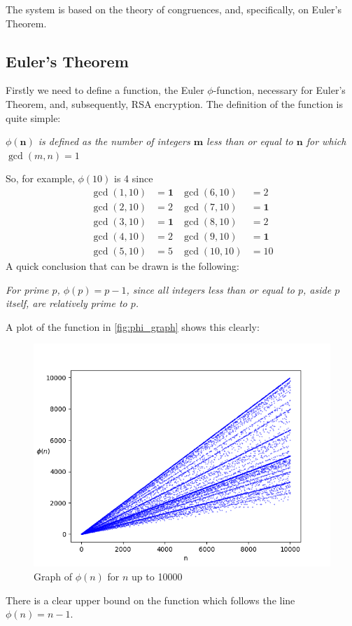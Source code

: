 \documentclass[12pt, titlepage]{article}
\begin{document}
The system is based on the theory of congruences, and, specifically, on Euler's Theorem.

\subsection{Euler's Theorem}

Firstly we need to define a function, the Euler $\phi$-function, necessary for Euler's
Theorem, and, subsequently, RSA encryption. The definition of the function is quite simple:
\autocite[106]{dence}

\textit{$\phi(\mathbf{n})$ is defined as the \emph{number} of integers $\mathbf{m}$ less
than or equal to $\mathbf{n}$ for which $\gcd(m, n) = 1$}

So, for example, $\phi(10)$ is 4 since 
%
\begin{align*}
    \gcd(1, 10) &= \mathbf{1} &\gcd(6, 10) &= 2\\
    \gcd(2, 10) &= 2          &\gcd(7, 10) &= \mathbf{1}\\
    \gcd(3, 10) &= \mathbf{1} &\gcd(8, 10) &= 2\\
    \gcd(4, 10) &= 2          &\gcd(9, 10) &= \mathbf{1}\\
    \gcd(5, 10) &= 5          &\gcd(10, 10) &= 10
\end{align*}
%
A quick conclusion that can be drawn is the following:

\textit{For prime $p$, $\phi(p) = p - 1$, since all integers less than or equal to $p$,
aside $p$ itself, are relatively prime to $p$.} 

A plot of the function in \autoref{fig:phi_graph} shows this clearly:
%
\begin{figure}[H]
    \centering
    \includegraphics[width=\textwidth]{phi_10000}
    \caption{Graph of $\phi(n)$ for $n$ up to 10000}
    \label{fig:phi_graph}
\end{figure}
%
There is a clear upper bound on the function which follows the line $\phi(n) = n-1$.
\end{document}
